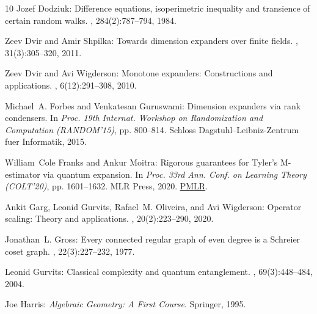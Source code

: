 \documentclass[11pt]{article}
\theoremstyle{plain}
\numberwithin{equation}{section}
\theoremstyle{definition}
\begin{document}
\begin{thebibliography}{10}
{\sc Jozef Dodziuk}: Difference equations, isoperimetric inequality and
  transience of certain random walks.
, 284(2):787--794, 1984.
\newblock [\epfmtdoi{10.2307/1999107}]

{\sc Zeev Dvir and Amir Shpilka}: Towards dimension expanders over finite
  fields.
, 31(3):305--320, 2011.
\newblock [\epfmtdoi{10.1007/s00493-011-2540-8}]

{\sc Zeev Dvir and Avi Wigderson}: Monotone expanders: {C}onstructions and
  applications.
, 6(12):291--308, 2010.

{\sc Michael~A. Forbes and Venkatesan Guruswami}: Dimension expanders via rank
  condensers.
\newblock In {\em Proc. 19th Internat. Workshop on Randomization and
  Computation (RANDOM'15)}, pp. 800--814. Schloss Dagstuhl--Leibniz-Zentrum
  fuer Informatik, 2015.

{\sc William~Cole Franks and Ankur Moitra}: Rigorous guarantees for {Tyler’s
  M-estimator} via quantum expansion.
\newblock In {\em Proc. 33rd Ann. Conf. on Learning Theory (COLT'20)}, pp.
  1601--1632. MLR Press, 2020.
\newblock
  \href{http://proceedings.mlr.press/v125/franks20a/franks20a.pdf}{PMLR}.

{\sc Ankit Garg, Leonid Gurvits, Rafael~M. Oliveira, and Avi Wigderson}:
  Operator scaling: {T}heory and applications.
, 20(2):223--290, 2020.
\newblock [\epfmtdoi{10.1007/s10208-019-09417-z}]

{\sc Jonathan~L. Gross}: Every connected regular graph of even degree is a
  {S}chreier coset graph.
, 22(3):227--232, 1977.
\newblock [\epfmtdoi{10.1016/0095-8956(77)90068-5}]

{\sc Leonid Gurvits}: Classical complexity and quantum entanglement.
, 69(3):448--484, 2004.

{\sc Joe Harris}: {\em Algebraic Geometry: {A} First Course}.
\newblock Springer, 1995.
\newblock [\epfmtdoi{10.1007/978-1-4757-2189-8}]


\end{thebibliography}
\end{document}
